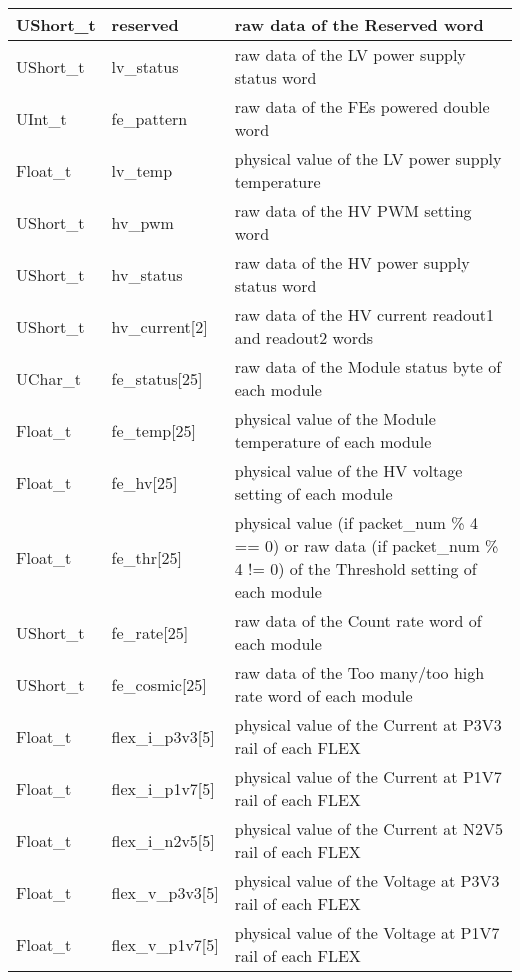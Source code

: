 \documentclass[a4paper, 12pt, onecolumn]{article}
\begin{document}
\begin{center}
\begin{supertabular}{| p{18mm} | p{38mm} | p{66mm} |}
    UShort\_t   & reserved                 & raw data of the Reserved word \\\hline
    UShort\_t   & lv\_status               & raw data of the LV power supply status word \\\hline
    UInt\_t     & fe\_pattern              & raw data of the FEs powered double word \\\hline
    Float\_t    & lv\_temp                 & physical value of the LV power supply temperature \\\hline
    UShort\_t   & hv\_pwm                  & raw data of the HV PWM setting word \\\hline
    UShort\_t   & hv\_status               & raw data of the HV power supply status word \\\hline
    UShort\_t   & hv\_current[2]           & raw data of the HV current readout1 and readout2 words \\\hline
    UChar\_t    & fe\_status[25]           & raw data of the Module status byte of each module \\\hline
    Float\_t    & fe\_temp[25]             & physical value of the Module temperature of each module \\\hline
    Float\_t    & fe\_hv[25]               & physical value of the HV voltage setting of each module \\\hline
    Float\_t    & fe\_thr[25]              & physical value (if packet\_num \% 4 == 0) or raw data (if packet\_num \% 4 != 0) of the Threshold setting of each module \\\hline
    UShort\_t   & fe\_rate[25]             & raw data of the Count rate word of each module \\\hline
    UShort\_t   & fe\_cosmic[25]           & raw data of the Too many/too high rate word of each module \\\hline
    Float\_t    & flex\_i\_p3v3[5]         & physical value of the Current at P3V3 rail of each FLEX \\\hline
    Float\_t    & flex\_i\_p1v7[5]         & physical value of the Current at P1V7 rail of each FLEX \\\hline
    Float\_t    & flex\_i\_n2v5[5]         & physical value of the Current at N2V5 rail of each FLEX \\\hline
    Float\_t    & flex\_v\_p3v3[5]         & physical value of the Voltage at P3V3 rail of each FLEX \\\hline
    Float\_t    & flex\_v\_p1v7[5]         & physical value of the Voltage at P1V7 rail of each FLEX \\\hline

\end{supertabular}
\end{center}
\end{document}
